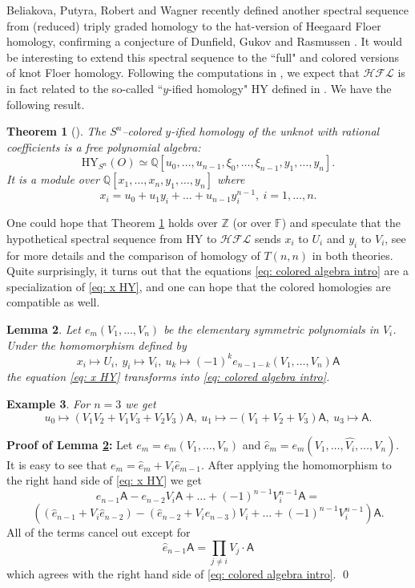 \documentclass{amsart}
\newtheorem{theorem}{Theorem}[section]
\newtheorem{lemma}[theorem]{Lemma}
\newtheorem{example}[theorem]{Example}
\newcommand{\F}{\mathbb{F}}
\newcommand{\cHFL}{\mathcal{H\!F\! L}}
\newcommand{\HY}{\mathrm{HY}}
\newcommand{\Z}{\mathbb{Z}}
\newcommand{\AAA}{\mathsf{A}}
\begin{document}
Beliakova, Putyra, Robert and Wagner \cite{BPRW} recently defined another spectral sequence from (reduced) triply graded homology to the hat-version of Heegaard Floer homology, confirming a conjecture of Dunfield, Gukov and Rasmussen \cite{DGR}. It would be interesting to extend this spectral sequence to the ``full" and colored versions of knot Floer homology. 
Following the computations in \cite{AGL}, we expect that $\cHFL$ is in fact related to the so-called ``$y$-ified homology" $\HY$ defined in \cite{GHog}.
We have the following result.

\begin{theorem}[\cite{BGHW}]
\label{thm:colored HY}
The $S^n$--colored $y$-ified homology of the unknot with rational coefficients is a free polynomial algebra:
$$
\HY_{S^n}(O)\simeq \mathbb{Q}[u_0,\ldots,u_{n-1},\xi_0,\ldots,\xi_{n-1},y_1,\ldots,y_n].
$$
It is a module over  $\mathbb{Q}[x_1,\ldots,x_n,y_1,\ldots,y_n]$ where
\begin{equation}
\label{eq: x HY}
x_i=u_0+u_{1}y_i+\ldots+u_{n-1}y_i^{n-1},\ i=1,\ldots,n.
\end{equation}
\end{theorem}

One could hope that Theorem \ref{thm:colored HY} holds over $\Z$ (or over $\F$) and speculate that the hypothetical spectral sequence from $\HY$ to $\cHFL$ sends $x_i$ to $U_i$ and $y_i$ to $V_i$, see \cite{AGL} for more details and the comparison of  homology of $T(n,n)$ in both theories. 
Quite surprisingly, it turns out that the equations \eqref{eq: colored algebra intro} are a specialization of \eqref{eq: x HY}, and one can hope that the colored homologies are compatible as well.

\begin{lemma}
\label{lem: HY specialization}
Let $e_{m}(V_1,\ldots,V_n)$ be the elementary symmetric polynomials in $V_i$. Under the homomorphism defined by
$$
x_i\mapsto U_i,\ y_i\mapsto V_i,\ u_k\mapsto (-1)^{k}e_{n-1-k}(V_1,\ldots,V_n)\AAA
$$
the equation \eqref{eq: x HY} transforms into \eqref{eq: colored algebra intro}. 
\end{lemma}

\begin{example}
For $n=3$ we get
$$
u_0\mapsto (V_1V_2+V_1V_3+V_2V_3)\AAA,\ u_1\mapsto -(V_1+V_2+V_3)\AAA,\ u_3\mapsto \AAA.
$$
\end{example}

\noindent \textbf{Proof of Lemma \ref{lem: HY specialization}:}
Let $e_m=e_{m}(V_1,\ldots,V_n)$ and $
\widehat{e}_m=e_{m}(V_1,\ldots,\widehat{V_i},\ldots,V_n).$
It is easy to see that 
$
e_m=\widehat{e}_m+V_i\widehat{e}_{m-1}.
$
After applying the homomorphism to the right hand side of \eqref{eq: x HY} we get
$$
e_{n-1}\AAA-e_{n-2}V_i\AAA+\ldots+(-1)^{n-1}V_i^{n-1}\AAA=
$$
$$
\left((\widehat{e}_{n-1}+V_i\widehat{e}_{n-2})-(\widehat{e}_{n-2}+V_i\widehat{e}_{n-3})V_i+\ldots+(-1)^{n-1}V_i^{n-1}\right)\AAA.
$$
All of the terms cancel out except for
$$
\widehat{e}_{n-1}\AAA=\prod_{j\neq i}V_j\cdot \AAA
$$
which agrees with the right hand side of \eqref{eq: colored algebra intro}.
\qed
\end{document}

